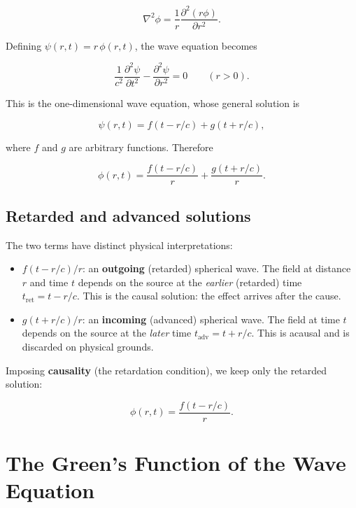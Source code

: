 \begin{equation}
\nabla^2\phi = \frac{1}{r}\frac{\partial^2(r\phi)}{\partial r^2}.
\end{equation}

Defining $\psi(r,t) = r\,\phi(r,t)$, the wave equation becomes

\begin{equation}
\frac{1}{c^2}\frac{\partial^2\psi}{\partial t^2} - \frac{\partial^2\psi}{\partial r^2} = 0 \qquad (r > 0).
\end{equation}

This is the one-dimensional wave equation, whose general solution is

\begin{equation}
\psi(r,t) = f(t - r/c) + g(t + r/c),
\end{equation}

where $f$ and $g$ are arbitrary functions. Therefore

\begin{equation}
\phi(r,t) = \frac{f(t - r/c)}{r} + \frac{g(t + r/c)}{r}.
\end{equation}

\subsection{Retarded and advanced solutions}

The two terms have distinct physical interpretations:

\begin{itemize}
\item $f(t - r/c)/r$: an \textbf{outgoing} (retarded) spherical wave. The field at distance $r$ and time $t$ depends on the source at the \emph{earlier} (retarded) time $t_{\text{ret}} = t - r/c$. This is the causal solution: the effect arrives after the cause.
\item $g(t + r/c)/r$: an \textbf{incoming} (advanced) spherical wave. The field at time $t$ depends on the source at the \emph{later} time $t_{\text{adv}} = t + r/c$. This is acausal and is discarded on physical grounds.
\end{itemize}

Imposing \textbf{causality} (the retardation condition), we keep only the retarded solution:

\begin{equation}
\phi(r,t) = \frac{f(t - r/c)}{r}.
\end{equation}

\section{The Green's Function of the Wave Equation}

